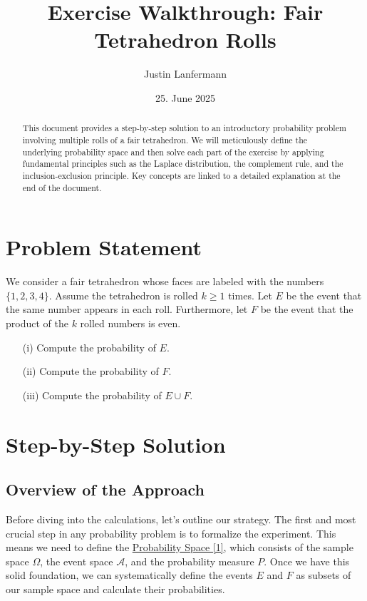 \documentclass[11pt,a4paper]{article}
\title{Exercise Walkthrough: Fair Tetrahedron Rolls}
\author{Justin Lanfermann}
\date{25. June 2025}
\begin{document}
\maketitle

\begin{abstract}
    This document provides a step-by-step solution to an introductory probability problem involving multiple rolls of a fair tetrahedron. We will meticulously define the underlying probability space and then solve each part of the exercise by applying fundamental principles such as the Laplace distribution, the complement rule, and the inclusion-exclusion principle. Key concepts are linked to a detailed explanation at the end of the document.
\end{abstract}

\section{Problem Statement}

We consider a fair tetrahedron whose faces are labeled with the numbers $\{1, 2, 3, 4\}$. Assume the tetrahedron is rolled $k \geq 1$ times. Let $E$ be the event that the same number appears in each roll. Furthermore, let $F$ be the event that the product of the $k$ rolled numbers is even.
\begin{enumerate}
    \item[(i)] Compute the probability of $E$.
    \item[(ii)] Compute the probability of $F$.
    \item[(iii)] Compute the probability of $E \cup F$.
\end{enumerate}

\section{Step-by-Step Solution}

\subsection{Overview of the Approach}
Before diving into the calculations, let's outline our strategy. The first and most crucial step in any probability problem is to formalize the experiment. This means we need to define the \hyperlink{concept:probspace}{Probability Space [1]}, which consists of the sample space $\Omega$, the event space $\mathcal{A}$, and the probability measure $P$. Once we have this solid foundation, we can systematically define the events $E$ and $F$ as subsets of our sample space and calculate their probabilities.
\end{document}
